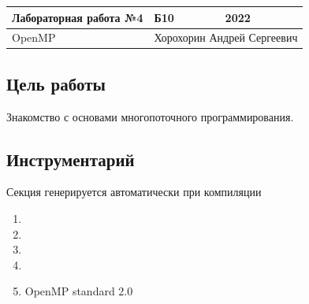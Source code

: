 \documentclass[14pt, russian, onesize]{extreport}
\begin{document}
\begin{tabular}{|p{8cm}|p{3cm}|p{3cm}|}
    \hline
    Лабораторная работа №4 & Б10 & 2022\\
    \hline
    OpenMP  & \multicolumn{2}{|c|}{Хорохорин Андрей Сергеевич}\\
    \hline
\end{tabular}
\subsection*{ Цель работы }
Знакомство с основами многопоточного программирования.
\subsection*{ Инструментарий }
Секция генерируется автоматически при компиляции
\begin{enumerate}
    \item {}
    \item {}
    \item {}
    \item {}
    \item OpenMP standard 2.0
\end{enumerate}
\end{document}
